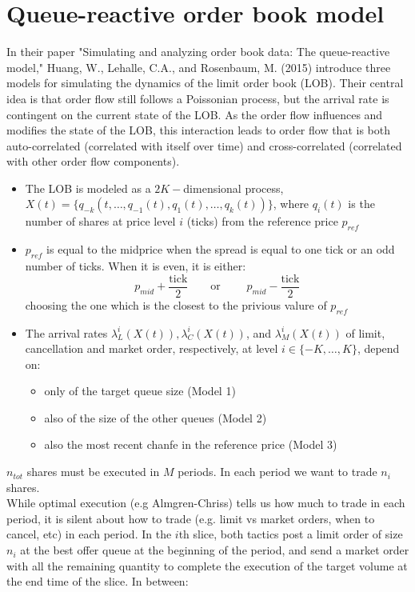 \section{Queue-reactive order book model} 
In their paper "Simulating and analyzing order book data: The queue-reactive model," Huang, W., Lehalle, C.A., and Rosenbaum, M. (2015) introduce three models for simulating the dynamics of the limit order book (LOB). Their central idea is that order flow still follows a Poissonian process, but the arrival rate is contingent on the current state of the LOB. As the order flow influences and modifies the state of the LOB, this interaction leads to order flow that is both auto-correlated (correlated with itself over time) and cross-correlated (correlated with other order flow components).
\begin{mysetting}
	\begin{itemize}
		\item The LOB is modeled as a $2K-$dimensional process, $X(t) = \{q_{-k}(t,\ldots, q_{-1}(t),q_1(t),\ldots,q_k(t))\}$, where $q_i(t)$ is the number of shares at price level $i$ (ticks) from the reference price $p_{ref}$
		\item $p_{ref}$ is equal to the midprice when the spread is equal to one tick or an odd number of ticks. When it is even, it is either:
		\[
		p_{mid} + \frac{\text{tick}}{2}\qquad \text{or }\qquad p_{mid} - \frac{\text{tick}}{2}
		\]
		choosing the one which is the closest to the privious valure of $p_{ref}$
		\item The arrival rates $\lambda_L^i (X(t)), \lambda_C^i (X(t))$, and $\lambda^i_M (X(t))$ of limit, cancellation and market order, respectively, at level $i \in \{-K,\ldots, K\}$, depend on:
		\begin{itemize}
			\item only of the target queue size (Model 1)
			\item also of the size of the other queues (Model 2)
			\item also the most recent chanfe in the reference price (Model 3)
		\end{itemize}
	\end{itemize}
\end{mysetting}
$n_{tot}$ shares must be executed in $M$ periods. In each period we want to trade $n_i$ shares.\\
While optimal execution (e.g Almgren-Chriss) tells us how much to trade in each period, it is silent about how to trade (e.g. limit vs market orders, when to cancel, etc) in each period. In the $i$th slice, both tactics post a limit order of size $n_i$ at the best offer queue at the beginning of the period, and send a market order with all the remaining quantity to complete the execution of the target volume at the end time of the slice. In between:

